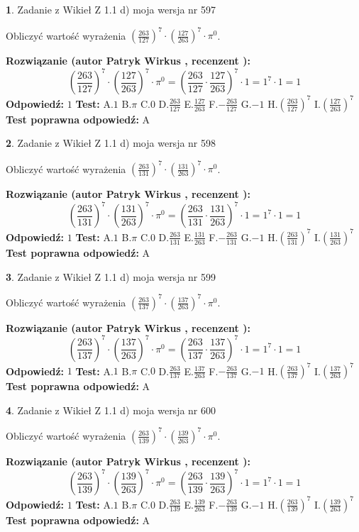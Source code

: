 \documentclass[12pt, a4paper]{article}
\theoremstyle{definition} %
\newtheorem{zad}{}
\newcommand{\zadStart}[1]{\begin{zad}#1\newline}
\newcommand{\zadStop}{\end{zad}}
\newcommand{\rozwStart}[2]{\noindent \textbf{Rozwiązanie (autor #1 , recenzent #2): }\newline}
\newcommand{\rozwStop}{\newline}
\newcommand{\odpStart}{\noindent \textbf{Odpowiedź:}\newline}
\newcommand{\odpStop}{\newline}
\newcommand{\testStart}{\noindent \textbf{Test:}\newline}
\newcommand{\testStop}{\newline}
\newcommand{\kluczStart}{\noindent \textbf{Test poprawna odpowiedź:}\newline}
\newcommand{\kluczStop}{\newline}
\begin{document}
\zadStart{Zadanie z Wikieł Z 1.1 d) moja wersja nr 597}

Obliczyć wartość wyrażenia $(\frac{263}{127})^{7} \cdot (\frac{127}{263})^{7} \cdot \pi^{0}$.
\zadStop
\rozwStart{Patryk Wirkus}{}
$$(\frac{263}{127})^{7} \cdot (\frac{127}{263})^{7} \cdot \pi^{0} = (\frac{263}{127} \cdot \frac{127}{263})^{7} \cdot 1 = 1^{7} \cdot 1 = 1$$
\rozwStop
\odpStart
$1$
\odpStop
\testStart
A.$1$ B.$\pi$ C.$0$ D.$\frac{263}{127}$ E.$\frac{127}{263}$
F.$-\frac{263}{127}$ G.$-1$
H.$(\frac{263}{127})^{7}$
I.$(\frac{127}{263})^{7}$
\testStop
\kluczStart
A
\kluczStop



\zadStart{Zadanie z Wikieł Z 1.1 d) moja wersja nr 598}

Obliczyć wartość wyrażenia $(\frac{263}{131})^{7} \cdot (\frac{131}{263})^{7} \cdot \pi^{0}$.
\zadStop
\rozwStart{Patryk Wirkus}{}
$$(\frac{263}{131})^{7} \cdot (\frac{131}{263})^{7} \cdot \pi^{0} = (\frac{263}{131} \cdot \frac{131}{263})^{7} \cdot 1 = 1^{7} \cdot 1 = 1$$
\rozwStop
\odpStart
$1$
\odpStop
\testStart
A.$1$ B.$\pi$ C.$0$ D.$\frac{263}{131}$ E.$\frac{131}{263}$
F.$-\frac{263}{131}$ G.$-1$
H.$(\frac{263}{131})^{7}$
I.$(\frac{131}{263})^{7}$
\testStop
\kluczStart
A
\kluczStop



\zadStart{Zadanie z Wikieł Z 1.1 d) moja wersja nr 599}

Obliczyć wartość wyrażenia $(\frac{263}{137})^{7} \cdot (\frac{137}{263})^{7} \cdot \pi^{0}$.
\zadStop
\rozwStart{Patryk Wirkus}{}
$$(\frac{263}{137})^{7} \cdot (\frac{137}{263})^{7} \cdot \pi^{0} = (\frac{263}{137} \cdot \frac{137}{263})^{7} \cdot 1 = 1^{7} \cdot 1 = 1$$
\rozwStop
\odpStart
$1$
\odpStop
\testStart
A.$1$ B.$\pi$ C.$0$ D.$\frac{263}{137}$ E.$\frac{137}{263}$
F.$-\frac{263}{137}$ G.$-1$
H.$(\frac{263}{137})^{7}$
I.$(\frac{137}{263})^{7}$
\testStop
\kluczStart
A
\kluczStop



\zadStart{Zadanie z Wikieł Z 1.1 d) moja wersja nr 600}

Obliczyć wartość wyrażenia $(\frac{263}{139})^{7} \cdot (\frac{139}{263})^{7} \cdot \pi^{0}$.
\zadStop
\rozwStart{Patryk Wirkus}{}
$$(\frac{263}{139})^{7} \cdot (\frac{139}{263})^{7} \cdot \pi^{0} = (\frac{263}{139} \cdot \frac{139}{263})^{7} \cdot 1 = 1^{7} \cdot 1 = 1$$
\rozwStop
\odpStart
$1$
\odpStop
\testStart
A.$1$ B.$\pi$ C.$0$ D.$\frac{263}{139}$ E.$\frac{139}{263}$
F.$-\frac{263}{139}$ G.$-1$
H.$(\frac{263}{139})^{7}$
I.$(\frac{139}{263})^{7}$
\testStop
\kluczStart
A
\kluczStop
\end{document}
